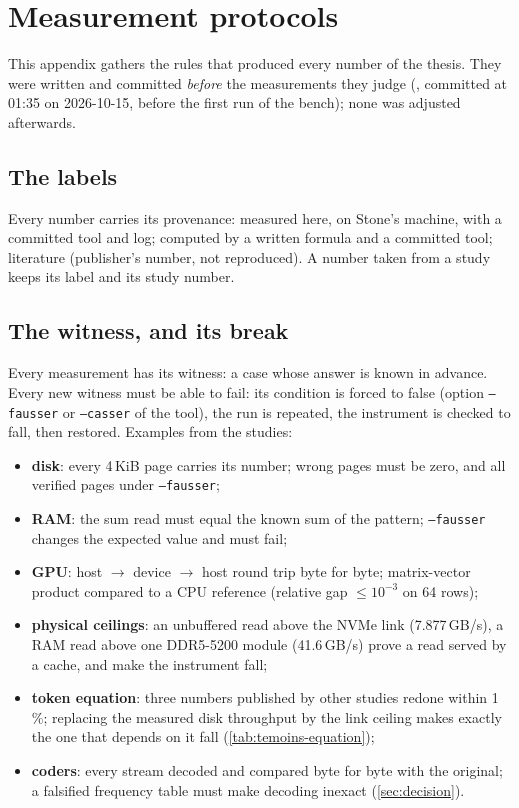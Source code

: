 \chapter{Measurement protocols}\label{ann:protocoles}

This appendix gathers the rules that produced every \mes{} number of the thesis. They were written and committed \emph{before} the measurements they judge (, committed at 01:35 on 2026-10-15, before the first run of the bench); none was adjusted afterwards.

\section{The labels}

Every number carries its provenance: \mes{} measured here, on Stone's machine, with a committed tool and log; \calc{} computed by a written formula and a committed tool; \litt{} literature (publisher's number, not reproduced). A number taken from a study keeps its label and its study number.

\section{The witness, and its break}\label{sec:protocole-temoin}

Every measurement has its witness: a case whose answer is known in advance. Every new witness must be able to fail: its condition is forced to false (option \texttt{--fausser} or \texttt{--casser} of the tool), the run is repeated, the instrument is checked to fall, then restored. Examples from the studies:
\begin{itemize}
\item \textbf{disk}: every 4\,KiB page carries its number; wrong pages must be zero, and all verified pages under \texttt{--fausser};
\item \textbf{RAM}: the sum read must equal the known sum of the pattern; \texttt{--fausser} changes the expected value and must fail;
\item \textbf{GPU}: host $\to$ device $\to$ host round trip byte for byte; matrix-vector product compared to a CPU reference (relative gap $\le 10^{-3}$ on 64 rows);
\item \textbf{physical ceilings}: an unbuffered read above the NVMe link (7.877\,GB/s), a RAM read above one DDR5-5200 module (41.6\,GB/s) prove a read served by a cache, and make the instrument fall;
\item \textbf{token equation}: three numbers published by other studies redone within 1\,\%; replacing the measured disk throughput by the link ceiling makes exactly the one that depends on it fall (\cref{tab:temoins-equation});
\item \textbf{coders}: every stream decoded and compared byte for byte with the original; a falsified frequency table must make decoding inexact (\cref{sec:decision}).
\end{itemize}

